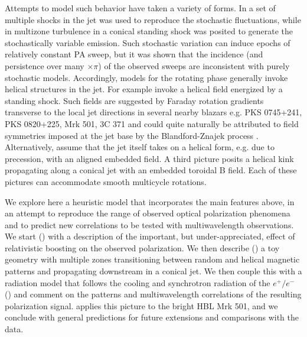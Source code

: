 Attempts to model such behavior have taken a variety of forms. In \citet{hughes_synchrotron_1989} a set of multiple shocks in the jet was used to reproduce the stochastic fluctuations, while in \citet{marscher_turbulent_2014} multizone turbulence in a conical standing shock was posited to generate the stochastically variable emission. Such stochastic variation can induce epochs of relatively constant PA sweep, but it was shown \citep{blinov_robopol_2016} that the incidence (and persistence over many $\times \pi$) of the observed sweeps are inconsistent with purely stochastic models. Accordingly, models for the rotating phase generally invoke helical structures in the jet. For example \citet{zhang_polarization_2015} invoke a helical field energized by a standing shock. Such fields are suggested by Faraday rotation gradients transverse to the local jet directions in several nearby blazars e.g. PKS 0745+241, PKS 0820+225, Mrk 501, 3C 371 \citep{gabuzda_helical_2004} and could quite naturally be attributed to field symmetries imposed at the jet base by the Blandford-Znajek process \citep{blandford_electromagnetic_1977}. Alternatively, \citet{lyutikov_polarization_2017} assume that the jet itself takes on a helical form, e.g. due to precession, with an aligned embedded field. A third picture \citep{nalewajko_model_2017} posits a helical kink propagating along a conical jet with an embedded toroidal B field. Each of these pictures can accommodate smooth multicycle rotations.

We explore here a heuristic model that incorporates the main features above, in an attempt to reproduce the range of observed optical polarization phenomena and to predict new correlations to be tested with multiwavelength observations. We start () with a description of the important, but under-appreciated, effect of relativistic boosting on the observed polarization. We then describe () a toy geometry with multiple zones transitioning between random and helical magnetic patterns and propagating downstream in a conical jet. We then couple this with a radiation model that follows the cooling and synchrotron radiation of the $e^+/e^-$ () and comment on the patterns and multiwavelength correlations of the resulting polarization signal.  applies this picture to the bright HBL Mrk 501, and we conclude with general predictions for future extensions and comparisons with the data.

